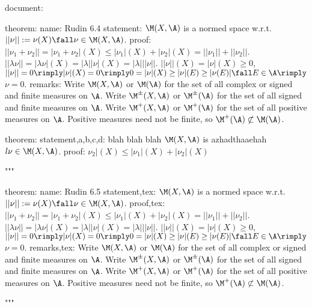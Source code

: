 

document:

    theorem:
        name:
            Rudin 6.4
        statement:
            $\M(X, \A)$ is a normed space w.r.t. $||\nu|| := \nu(X) \fall \nu \in \M(X, \A)$.
        proof:
            $|| \nu_1 + \nu_2 || = |\nu_1 + \nu_2|(X) \le |\nu_1|(X) + |\nu_2|(X) = ||\nu_1|| + ||\nu_2|| $. $||\lambda \nu|| = |\lambda \nu|(X) = |\lambda| |\nu|(X) = |\lambda| ||\nu||$. $||\nu||(X) = |\nu|(X) \ge 0$, $||\nu|| = 0 \rimply |\nu|(X) = 0 \rimply 0 = |\nu|(X) \ge |\nu|(E) \ge |\nu(E)| \fall E \in \A \rimply$ $\nu = 0$.
        remarks:
            Write $\M(X,\A)$ or $\M(\A)$ for the set of all complex or signed and finite measures on $\A$.
            Write $\M^\pm(X,\A)$ or $\M^\pm(\A)$ for the set of all signed and finite measures on $\A$.
            Write $\M^+(X,\A)$ or $\M^+(\A)$ for the set of all positive measures on $\A$. 
            Positive measures need not be finite, so $\M^+(\A) \not \subset \M(\A)$.
        
    theorem:
        statement,a,b,c,d:
            blah blah blah $\M(X, \A)$ is azhadthaaehah $l \nu \in \M(X, \A)$.
        proof:
            $\nu_2|(X) \le |\nu_1|(X) + |\nu_2|(X) $
















"""


theorem:
    name:
        Rudin 6.5
    statement,tex:
        $\M(X, \A)$ is a normed space w.r.t. $||\nu|| := \nu(X) \fall \nu \in \M(X, \A)$.
    proof,tex:
        $|| \nu_1 + \nu_2 || = |\nu_1 + \nu_2|(X) \le |\nu_1|(X) + |\nu_2|(X) = ||\nu_1|| + ||\nu_2|| $. $||\lambda \nu|| = |\lambda \nu|(X) = |\lambda| |\nu|(X) = |\lambda| ||\nu||$. $||\nu||(X) = |\nu|(X) \ge 0$, $||\nu|| = 0 \rimply |\nu|(X) = 0 \rimply 0 = |\nu|(X) \ge |\nu|(E) \ge |\nu(E)| \fall E \in \A \rimply$ $\nu = 0$.
    remarks,tex:
        Write $\M(X,\A)$ or $\M(\A)$ for the set of all complex or signed and finite measures on $\A$.
        Write $\M^\pm(X,\A)$ or $\M^\pm(\A)$ for the set of all signed and finite measures on $\A$.
        Write $\M^+(X,\A)$ or $\M^+(\A)$ for the set of all positive measures on $\A$. 
        Positive measures need not be finite, so $\M^+(\A) \not \subset \M(\A)$.



"""







